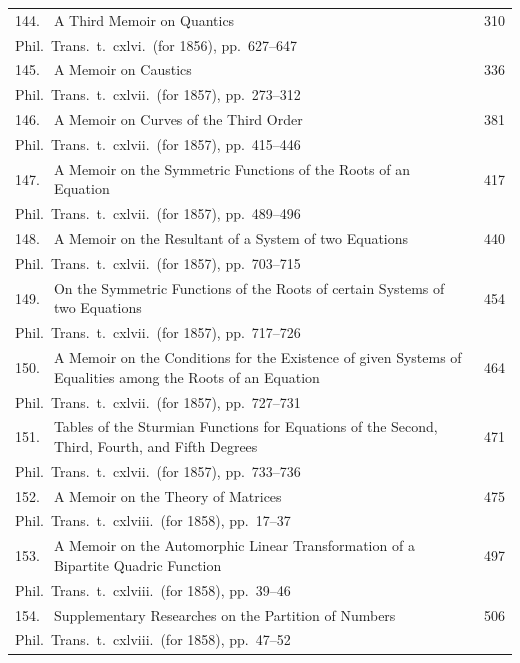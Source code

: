 \documentclass[11pt,a4paper]{book}
\begin{document}
\begin{longtable}{rp{8cm}l}
144. & A Third Memoir on Quantics & 310\\
\multicolumn{3}{l}{\small Phil.\ Trans.\ t.\ cxlvi.\ (for 1856), pp.\ 627--647}\\[0.5em]
145. & A Memoir on Caustics & 336\\
\multicolumn{3}{l}{\small Phil.\ Trans.\ t.\ cxlvii.\ (for 1857), pp.\ 273--312}\\[0.5em]
146. & A Memoir on Curves of the Third Order & 381\\
\multicolumn{3}{l}{\small Phil.\ Trans.\ t.\ cxlvii.\ (for 1857), pp.\ 415--446}\\[0.5em]
147. & A Memoir on the Symmetric Functions of the Roots of an Equation & 417\\
\multicolumn{3}{l}{\small Phil.\ Trans.\ t.\ cxlvii.\ (for 1857), pp.\ 489--496}\\[0.5em]
148. & A Memoir on the Resultant of a System of two Equations & 440\\
\multicolumn{3}{l}{\small Phil.\ Trans.\ t.\ cxlvii.\ (for 1857), pp.\ 703--715}\\[0.5em]
149. & On the Symmetric Functions of the Roots of certain Systems of two Equations & 454\\
\multicolumn{3}{l}{\small Phil.\ Trans.\ t.\ cxlvii.\ (for 1857), pp.\ 717--726}\\[0.5em]
150. & A Memoir on the Conditions for the Existence of given Systems of Equalities among the Roots of an Equation & 464\\
\multicolumn{3}{l}{\small Phil.\ Trans.\ t.\ cxlvii.\ (for 1857), pp.\ 727--731}\\[0.5em]
151. & Tables of the Sturmian Functions for Equations of the Second, Third, Fourth, and Fifth Degrees & 471\\
\multicolumn{3}{l}{\small Phil.\ Trans.\ t.\ cxlvii.\ (for 1857), pp.\ 733--736}\\[0.5em]
152. & A Memoir on the Theory of Matrices & 475\\
\multicolumn{3}{l}{\small Phil.\ Trans.\ t.\ cxlviii.\ (for 1858), pp.\ 17--37}\\[0.5em]
153. & A Memoir on the Automorphic Linear Transformation of a Bipartite Quadric Function & 497\\
\multicolumn{3}{l}{\small Phil.\ Trans.\ t.\ cxlviii.\ (for 1858), pp.\ 39--46}\\[0.5em]
154. & Supplementary Researches on the Partition of Numbers & 506\\
\multicolumn{3}{l}{\small Phil.\ Trans.\ t.\ cxlviii.\ (for 1858), pp.\ 47--52}\\[0.5em]

\end{longtable}
\end{document}
